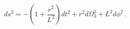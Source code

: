 \begin{equation}
\label{D3testdual}
ds^2=-(1+\frac{r^2}{L^2})dt^2+r^2d\Omega_3^2+L^2d\phi^2\, .
\end{equation}

